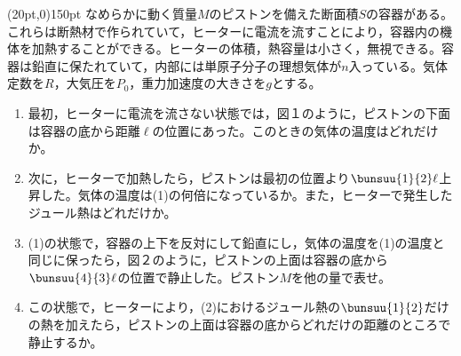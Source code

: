 \hakosyokika
\item
    \begin{mawarikomi}(20pt,0){150pt}{}
        なめらかに動く質量$M$のピストンを備えた断面積$S$の容器がある。これらは断熱材で作られていて，ヒーターに電流を流すことにより，容器内の機体を加熱することができる。ヒーターの体積，熱容量は小さく，無視できる。容器は鉛直に保たれていて，内部には単原子分子の理想気体が$n$入っている。気体定数を$R$，大気圧を$P_0$，重力加速度の大きさを$g$とする。
        \begin{enumerate}
            \item 最初，ヒーターに電流を流さない状態では，図１のように，ピストンの下面は容器の底から距離$\ell $の位置にあった。このときの気体の温度はどれだけか。
            \item 次に，ヒーターで加熱したら，ピストンは最初の位置より$\bunsuu{1}{2}\ell $上昇した。気体の温度は(1)の何倍になっているか。また，ヒーターで発生したジュール熱はどれだけか。
            \item (1)の状態で，容器の上下を反対にして鉛直にし，気体の温度を(1)の温度と同じに保ったら，図２のように，ピストンの上面は容器の底から$\bunsuu{4}{3}\ell $の位置で静止した。ピストン$M$を他の量で表せ。
            \item この状態で，ヒーターにより，(2)におけるジュール熱の$\bunsuu{1}{2}$だけの熱を加えたら，ピストンの上面は容器の底からどれだけの距離のところで静止するか。
        \end{enumerate}
    \end{mawarikomi}